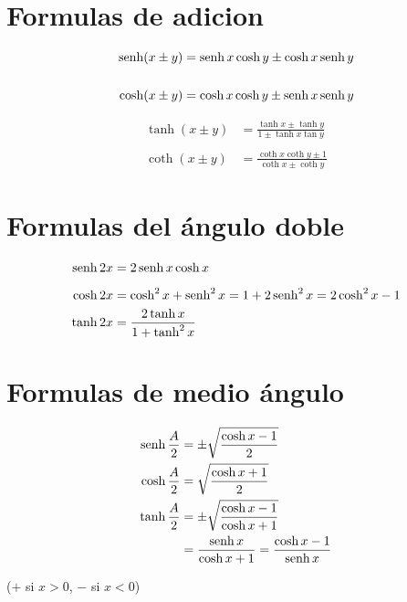 \section*{Formulas de adicion}
\begin{minipage}[c]{0.5\textwidth}
\begin{align*}
\operatorname{senh} (x \pm y) &= \operatorname{senh} x \cosh y \pm \cosh x \operatorname{senh} y\\\\
\cosh (x \pm y) &= \cosh x \cosh y \pm \operatorname{senh} x \operatorname{senh} y
\end{align*}

\end{minipage} 
\begin{minipage}[c]{0.5\textwidth}
\begin{align*}
\tanh (x \pm y) &= \frac{\tanh x \pm \tanh y}{1 \pm \tanh x \tan y}\\\\
\coth (x \pm y) &= \frac{\coth x \coth y \pm 1}{\coth x \pm \coth y}
\end{align*}
\end{minipage}

\section*{Formulas del ángulo doble}
\begin{align*}
	\operatorname{senh} 2x &= 2\operatorname{senh} x \cosh x \\[5pt]
	\cosh 2x &= \cosh^2 x +\operatorname{senh}^2 x = 1+2\operatorname{senh}^2 x = 2\cosh^2 x - 1 \\
	\tanh 2x &= \frac{2\tanh x}{1+\tanh^2 x}
\end{align*}

\section*{Formulas de medio ángulo}

\begin{align*}
	\operatorname{senh} \frac{A}{2} &= \pm\sqrt{\frac{\cosh x -1}{2}}\\
	\cosh \frac{A}{2} &= \sqrt{\frac{\cosh x +1}{2}}\\
	\tanh \frac{A}{2} &= \pm\sqrt{\frac{\cosh x -1}{\cosh x+1}}\\
					  &= \frac{\operatorname{senh} x}{\cosh x +1} = \frac{\cosh x -1}{\operatorname{senh} x}
\end{align*}
\begin{center}
($+$ si $x>0$, $-$ si $x<0$)
\end{center}

